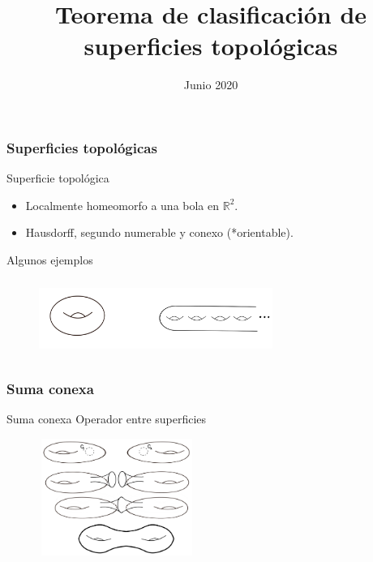 \documentclass{beamer}
\title[Teorema de clasificación de superficies]{Teorema de clasificación de superficies topológicas}
\author[Rodrigo De Pool]{}
\date[]{Junio 2020}
\begin{document}
\frame{\titlepage}
 
\begin{frame}
\frametitle{Superficies topológicas}

\begin{block}{Superficie topológica}
\begin{itemize}
    \item Localmente homeomorfo a una bola en $\mathbb{R}^2$.
    \item Hausdorff, segundo numerable y conexo (*orientable).
\end{itemize}
\end{block}

Algunos ejemplos
\begin{figure}[htb]
\begin{center}
\includegraphics[width=3in,height=1in]{imagenes/diapo1.png} 
\end{center}
\end{figure}

\end{frame}

\begin{frame}
\frametitle{Suma conexa}
\begin{block}{Suma conexa}
Operador entre superficies

\end{block}
\begin{figure}[htb]
\begin{center}
\includegraphics[width=2in,height=1.5in]{imagenes/sumaconexa_toros_R3.png} 
\end{center}
\end{figure}

\end{frame}
\end{document}
